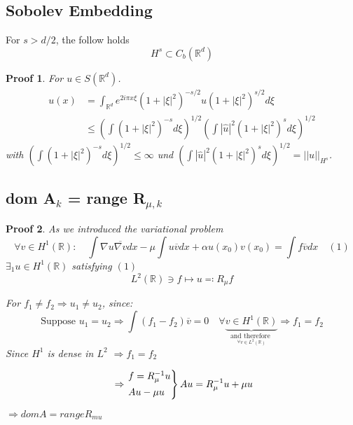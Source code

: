 \documentclass[14pt,a4paper]{scrartcl}
\newtheorem*{proof*}{Proof}
\numberwithin{equation}{section}
\newcommand{\R}{\mathbb{R}}
\begin{document}
\subsection{Sobolev Embedding} %
For $s>d/2$, the follow holds
	\[ H^s\subset C_b(\R^d) \]
	
\begin{proof*}
	For $u\in S(\R^d)$. 
	\begin{align*}
		u(x) & = \int_{\R^d} e^{2i\pi x\xi}(1+|\xi|^2)^{-s/2} \hat u(1+|\xi|^2)^{s/2} d\xi\nonumber\\
		 & \leq \left(\int (1+|\xi|^2)^{-s}d\xi \right)^{1/2} \left(\int |\hat u|^2 (1+|\xi|^2)^sd\xi \right)^{1/2}\nonumber 
	\end{align*}
	with $\left(\int (1+|\xi|^2)^{-s}d\xi \right)^{1/2}\leq \infty$ und $\left(\int |\hat u|^2 (1+|\xi|^2)^sd\xi \right)^{1/2} = ||u||_{H^s}$. 	
\end{proof*}

\subsection{dom A$_{k}$ = range R$_{\mu, k}$}

\begin{proof*}
	As we introduced the variational problem
	\[ \forall v \in H^{1}(\R): \quad \int \nabla u \overline{\nabla v}dx - \mu \int u \overline{v} dx + \alpha u(x_{0}) v(x_{0}) = \int f \overline{v} dx \quad (1) \]
$\exists_{1} u \in H^{1}(\R)$ satisfying $(1)$
	\[ L^{2}(\R) \ni f \mapsto u \eqqcolon R_{\mu} f \]
	
For $f_{1} \neq f_{2} \Rightarrow u_{1} \neq u_{2}$, since:
	\[ \text{Suppose } u_{1} = u_{2} \Rightarrow \int (f_{1} - f_{2}) \overline{v} = 0 \quad \forall \underbrace{v \in H^{1}(\R)}_{\underset{\forall v \in L^{2}(\R)}{\text{and therefore }}} \Rightarrow f_{1} = f_{2} \]
Since $H^{1}$  is dense in $L^{2}$ $\Longrightarrow f_{1} = f_{2}$

	\[ \Rightarrow \begin{rcases*} f = R^{-1}_{\mu} u \\ A u - \mu u \end{rcases*} Au = R_{\mu}^{-1} u + \mu u \]
	
$\Rightarrow dom A = range R_{mu}$
\end{proof*}
\end{document}
